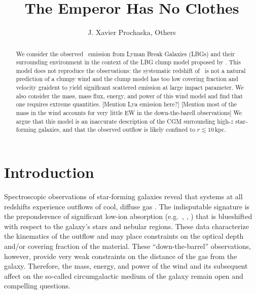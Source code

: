 \documentclass[12pt,preprint]{aastex}
\begin{document}
\title{The Emperor Has No Clothes}

\author{
J. Xavier Prochaska, 
Others
}

\begin{abstract}
We consider the observed \lya\ emission from Lyman Break Galaxies
(LBGs) and their surrounding environment in the context of the LBG
clump model proposed by \cite{steidel10}.  This model does not
reproduce the observations: the systematic redshift of \lya\ is not a
natural prediction of a clumpy wind and the clump model has too low
covering fraction and velocity graident to yield significant scattered
emission at large impact parameter.  We also consider the mass, mass
flux, energy, and power of this wind model and find that one requires
extreme quantities.  [Mention Lya emission here?]
[Mention most of the mass in the wind accounts for very little EW in
the down-the-barell observations]
We argue that this model is an inaccurate description of the CGM
surrounding high-$z$ star-forming galaxies, and that the observed
outflow is likely confined to $r \lesssim 10$\,kpc.
\end{abstract}


\section{Introduction}

Spectroscopic observations of star-forming galaxies reveal that 
systems at all redshifts experience outflows of cool, diffuse gas
\citep[e.g.][]{rupke,weiner,shapley03,rubin}.  The indisputable
signature is the preponderence of significant low-ion absorption
(e.g.\ , , ) that is
blueshifted with respect to the galaxy's stars and nebular regions.
These data characterize the kinematics of the outflow and may place
constraints on the optical depth and/or covering fraction of the
material.  These ``down-the-barrel'' observations, however, provide
very weak constraints on the distance of the gas from the galaxy.
Therefore, the mass, energy, and power of the wind and its subsequent
affect on the so-called circumgalactic medium of the galaxy remain
open and compelling questions.
\end{document}
